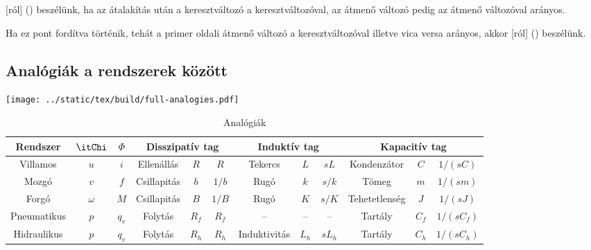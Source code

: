 \documentclass[../main.tex]{subfiles}
\begin{document}
[ról] () beszélünk, ha az átalakítás után a keresztváltozó
a keresztváltozóval, az átmenő változó pedig az átmenő változóval arányos.

Ha ez pont fordítva történik, tehát a primer oldali átmenő változó a keresztváltozóval
illetve vica versa arányos, akkor [ról] () beszélünk.

\subsection{Analógiák a rendszerek között}

\bgroup
\def\arraystretch{1.2}
\begin{table}[H]
  \centering
  \texttt{[image: ../static/tex/build/full-analogies.pdf]}
  \hspace{1cm}
  \begin{adjustbox}{angle=90}
    \centering
    \begin{tabular}{| c | c | c || c | c | c || c | c |c	|| c | c | c |}
      \hline
      Rendszer                              & $\itChi$ & $\varPhi$  &
      \multicolumn{3}{c||}{Disszipatív tag} &
      \multicolumn{3}{c||}{Induktív tag}    &
      \multicolumn{3}{c|}{Kapacitív tag}
      \\ \hline \hline
      Villamos                              & $u$      & $i$        &
      Ellenállás                            & $R$      & $R$        &
      Tekercs                               & $L$      & $sL$       &
      Kondenzátor                           & $C$      & $1/(sC)$
      \\ \hline
      Mozgó                                 & $v$      & $f$        &
      Csillapitás                           & $b$      & $1/b$      &
      Rugó                                  & $k$      & $s/k$      &
      Tömeg                                 & $m$      & $1/(sm)$
      \\ \hline
      Forgó                                 & $\omega$ & $M$        &
      Csillapitás                           & $B$      & $1/B$      &
      Rugó                                  & $K$      & $s/K$      &
      Tehetetlenség                         & $J$      & $1/(sJ)$
      \\ \hline
      Pneumatikus                           & $p$      & $q_v$      &
      Folytás                               & $R_f$    & $R_f$      &
      --                                    & --       & --         &
      Tartály                               & $C_f$    & $1/(sC_f)$
      \\ \hline
      Hidraulikus                           & $p$      & $q_v$      &
      Folytás                               & $R_h$    & $R_h$      &
      Induktivitás                          & $L_h$    & $sL_h$     &
      Tartály                               & $C_h$    & $1/(sC_h)$
      \\ \hline
    \end{tabular}
  \end{adjustbox}
  \caption{Analógiák}
  \label{fig:analogies}
\end{table}
\egroup
\end{document}
